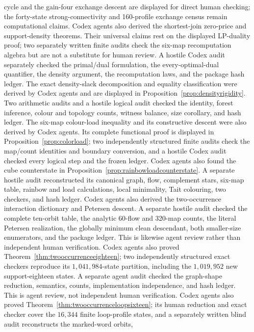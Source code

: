 \documentclass[11pt]{article}
\theoremstyle{definition}
\theoremstyle{remark}
\begin{document}
cycle and the gain-four exchange descent are displayed for direct human
checking; the forty-state strong-connectivity and 160-profile exchange
census remain computational claims.  Codex agents also derived the
shortest-join zero-price and support-density theorems.  Their universal
claims rest on the displayed LP-duality proof; two separately written
finite audits check the six-map recomputation algebra but are not a
substitute for human review.  A hostile Codex audit separately checked
the primal/dual formulation, the every-optimal-dual quantifier, the
density argument, the recomputation laws, and the package hash ledger.
The exact density-slack decomposition and equality classification were
derived by Codex agents and are displayed in
Proposition~\ref{prop:densityrigidity}.  Two arithmetic audits and a
hostile logical audit checked the identity, forest inference, colour and
topology counts, witness balance, size corollary, and hash ledger.
The six-map colour-load inequality and its constructive descent were
also derived by Codex agents.  Its complete functional proof is displayed
in Proposition~\ref{prop:colorload}; two independently structured finite
audits check the map/count identities and boundary conversion, and a
hostile Codex audit checked every logical step and the frozen ledger.
Codex agents also found the cube counterstate in
Proposition~\ref{prop:rainbowloadcounterstate}.  A separate hostile audit
reconstructed its canonical graph, flow, complement stars, six-map table,
rainbow and load calculations, local minimality, Tait colouring, two
checkers, and hash ledger.
Codex agents also derived the
two-occurrence interaction dictionary and Petersen descent.  A separate
hostile audit checked the complete ten-orbit table, the analytic
60-flow and 320-map counts, the literal Petersen realization, the
globally minimum clean descendant, both smaller-size enumerators, and the
package ledger.  This is likewise agent review rather than independent
human verification.  Codex agents also proved
Theorem~\ref{thm:twooccurrenceeighteen}; two independently structured
exact checkers reproduce its \(1{,}041{,}984\)-state partition, including
the \(1{,}019{,}952\) new support-eighteen states.  A separate agent audit
checked the graph-shape reduction, semantics, counts, implementation
independence, and hash ledger.  This is agent review, not independent
human verification.  Codex agents also proved
Theorem~\ref{thm:twooccurrenceloopsixteen}; its human reduction and exact
checker cover the \(16{,}344\) finite loop-profile states, and a
separately written blind audit reconstructs the marked-word orbits,
\end{document}
